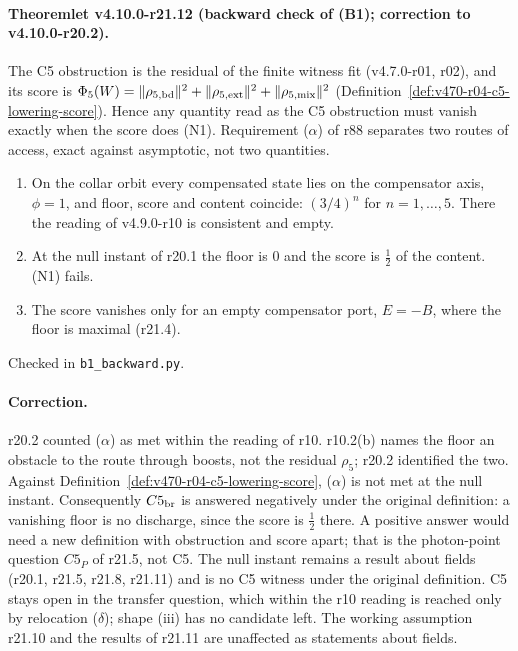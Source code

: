 \paragraph{Theoremlet v4.10.0-r21.12 (backward check of (B1); correction to v4.10.0-r20.2).}
The C5 obstruction is the residual of the finite witness fit (v4.7.0-r01, r02), and its score is
\(\Phi_5(W)=\|\rho_{5,\rm bd}\|^2+\|\rho_{5,\rm ext}\|^2+\|\rho_{5,\rm mix}\|^2\) (Definition~\ref{def:v470-r04-c5-lowering-score}).  Hence any quantity
read as the C5 obstruction must vanish exactly when the score does (N1).  Requirement (\(\alpha\)) of r88 separates two routes of
access, exact against asymptotic, not two quantities.
\begin{enumerate}[leftmargin=2em]
\item[(a)] On the collar orbit every compensated state lies on the compensator axis, \(\phi=1\), and floor, score and content coincide:
\((3/4)^n\) for \(n=1,\dots,5\).  There the reading of v4.9.0-r10 is consistent and empty.
\item[(b)] At the null instant of r20.1 the floor is \(0\) and the score is \(\tfrac12\) of the content.  (N1) fails.
\item[(c)] The score vanishes only for an empty compensator port, \(E=-B\), where the floor is maximal (r21.4).
\end{enumerate}
Checked in \texttt{b1\_\allowbreak backward.py}.

\paragraph{Correction.}
r20.2 counted (\(\alpha\)) as met within the reading of r10.  r10.2(b) names the floor an obstacle to the route through boosts, not the
residual \(\rho_5\); r20.2 identified the two.  Against Definition~\ref{def:v470-r04-c5-lowering-score}, (\(\alpha\)) is not met at the null instant.
Consequently \(C5_{\rm br}\) is answered negatively under the original definition: a vanishing floor is no discharge, since the score is
\(\tfrac12\) there.  A positive answer would need a new definition with obstruction and score apart; that is the photon-point question
\(C5_P\) of r21.5, not C5.  The null instant remains a result about fields (r20.1, r21.5, r21.8, r21.11) and is no C5 witness under the
original definition.  C5 stays open in the transfer question, which within the r10 reading is reached only by relocation
(\(\delta\)); shape (iii) has no candidate left.  The working assumption r21.10 and the results of r21.11 are unaffected as statements
about fields.

